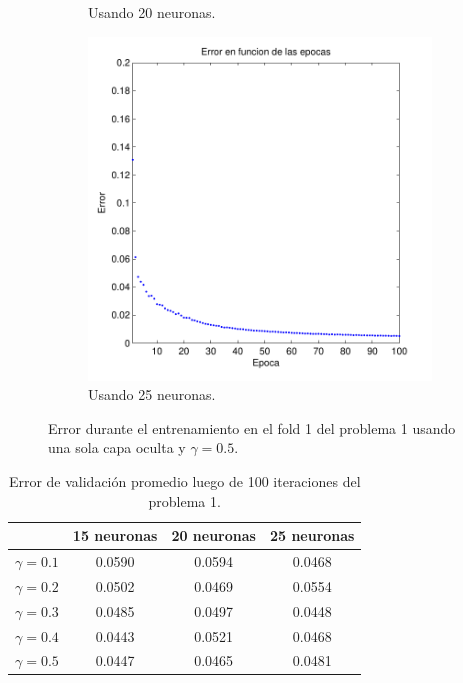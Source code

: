 \documentclass[informe.tex]{subfiles}
\begin{document}
\begin{figure}
\begin{subfigure}[b]{0.32\textwidth}
                \caption{Usando 20 neuronas.}
                \label{fig:d1-f1-05-n20}
        \end{subfigure}
        \begin{subfigure}[b]{0.32\textwidth}
                \includegraphics[width=\textwidth]{graficos/error_fold1_25_binary_100_05.pdf}
                \caption{Usando 25 neuronas.}
                \label{fig:d1-f1-05-n25}
        \end{subfigure}
        
        \caption{Error durante el entrenamiento en el fold 1 del problema 1 usando una sola capa oculta y $\gamma=0.5$.}\label{fig:p1-f1-gamma05}
    \end{figure}    
    
    \FloatBarrier
    
    \begin{table}[H]
      \begin{center}
	\begin{tabular}{|c|c|c|c|}
	\hline
	& 15 neuronas & 20 neuronas & 25 neuronas \\ 
	\hline
	$\gamma=0.1$ & 0.0590 & 0.0594 & 0.0468 \\
	\hline
	$\gamma=0.2$ & 0.0502 & 0.0469 & 0.0554 \\
	\hline
	$\gamma=0.3$ & 0.0485 & 0.0497 & 0.0448 \\
	\hline
	$\gamma=0.4$ & 0.0443 & 0.0521 & 0.0468 \\
	\hline     
	$\gamma=0.5$ & 0.0447 & 0.0465 & 0.0481 \\
	\hline      
	\end{tabular}
	\caption{Error de validación promedio luego de 100 iteraciones del problema 1.}
	\label{tab:error-d1-f1}
      \end{center}
    \end{table}
    
\end{document}
